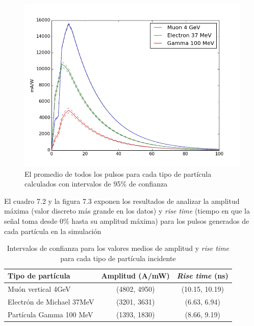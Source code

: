 \documentclass{book}
\begin{document}
\begin{figure}[h] %
\begin{center}
 \includegraphics[width=0.8\linewidth]{PulsosCaracteristicos.png}
\caption{El promedio de todos los pulsos para cada tipo de part\'icula calculados con intervalos de 95\% de confianza}
\end{center}
\end{figure}

El cuadro 7.2 y la figura 7.3 exponen los resultados de analizar la amplitud m\'axima (valor discreto m\'as grande en los datos) y \textit{rise time} (tiempo en que la se\~nal toma desde 0\% hasta su amplitud m\'axima) para los pulsos generados de cada part\'icula en la simulaci\'on

\begin{table}[h]
\caption{ Intervalos de confianza para los valores medios de amplitud y \textit{rise time} para cada tipo de part\'icula incidente}
\centering
\begin{tabular}{l | c c}
\hline
Tipo de part\'icula & Amplitud (A/mW) & \textit{Rise time} (ns) \\ \hline
Mu\'on vertical 4GeV & (4802, 4950) & (10.15, 10.19) \\
Electr\'on de Michael 37MeV & (3201, 3631) & (6.63, 6.94) \\
Part\'icula Gamma 100 MeV & (1393, 1830) & (8.66, 9.19)\\

\hline
\end{tabular}
\end{table}
\end{document}
